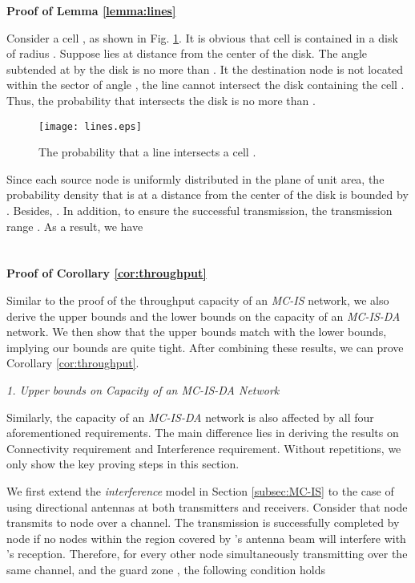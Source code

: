 \documentclass[10pt,journal]{IEEEtran}
\def\done{\hspace*{\fill} }
\begin{document}
\textbf{Proof of Lemma \ref{lemma:lines}}

Consider a cell , as shown in Fig. \ref{fig:lines}. It is obvious that cell  is contained in a disk of radius . Suppose  lies at distance  from the center of the disk. The angle  subtended at  by the disk is no more than . It the destination node  is not located within the sector of angle , the line  cannot intersect the disk containing the cell . Thus, the probability that  intersects the disk is no more than . 

\begin{figure}[t]
\centering
\texttt{[image: lines.eps]}
\caption{The probability that a line  intersects a cell .}
\label{fig:lines}
\end{figure}


Since each source node  is uniformly distributed in the plane of unit area, the probability density that  is at a distance  from the center of the disk is bounded by . Besides, . In addition, to ensure the successful transmission, the transmission range . As a result, we have
 \done

\section{}

\textbf{Proof of Corollary \ref{cor:throughput}}

Similar to the proof of the throughput capacity of an \textit{MC-IS} network, we also derive the upper bounds and the lower bounds on the capacity of an \textit{MC-IS-DA} network. We then show that the upper bounds match with the lower bounds, implying our bounds are quite tight. After combining these results, we can prove Corollary \ref{cor:throughput}.

\emph{1. Upper bounds on Capacity of an MC-IS-DA Network}

Similarly, the capacity of an \textit{MC-IS-DA} network is also affected by all four aforementioned requirements. The main difference lies in deriving the results on Connectivity requirement and Interference requirement. Without repetitions, we only show the key proving steps in this section. 

We first extend the \emph{interference} model in Section \ref{subsec:MC-IS} to the case of using directional antennas at both transmitters and receivers. Consider that node  transmits to node  over a channel. The transmission is successfully completed by node  if no nodes within the region covered by 's antenna beam will interfere with 's reception. Therefore, for every other node  simultaneously transmitting over the same channel, and the guard zone , the following condition holds
\end{document}
